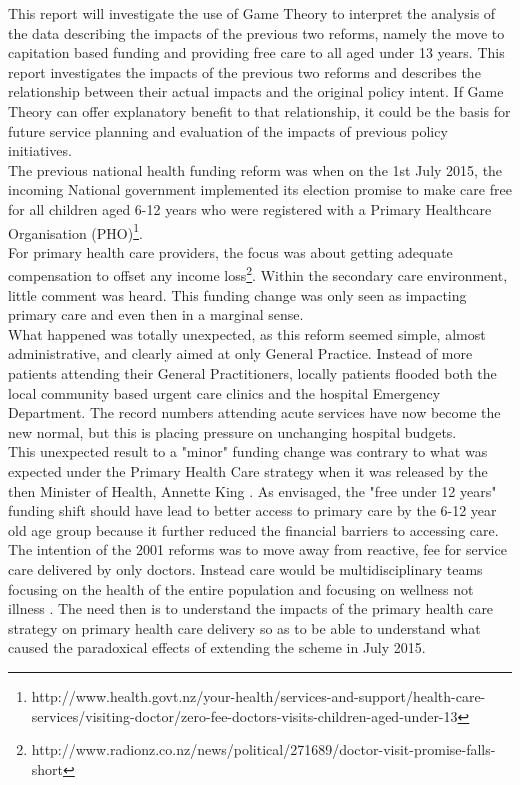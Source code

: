 \documentclass[11pt,a4paper]{article}
\begin{document}
This report will investigate the use of Game Theory to interpret the analysis of the data describing the impacts of the previous two reforms, namely the move to capitation based funding and providing free care to all aged under 13 years. This report investigates the impacts of the previous two reforms and describes the relationship between their actual impacts and the original policy intent. If Game Theory can offer explanatory benefit to that relationship, it could be the basis for future service planning and evaluation of the impacts of previous policy initiatives.\\ 

The previous national health funding reform was when on the 1st July 2015, the incoming National government implemented its election promise to make care free for all children aged 6-12 years who were registered with a Primary Healthcare Organisation (PHO)\footnote{http://www.health.govt.nz/your-health/services-and-support/health-care-services/visiting-doctor/zero-fee-doctors-visits-children-aged-under-13}.\\

For primary health care providers, the focus was about getting adequate compensation to offset any income loss\footnote{http://www.radionz.co.nz/news/political/271689/doctor-visit-promise-falls-short}. Within the secondary care environment, little comment was heard. This funding change was only seen as impacting primary care and even then in a marginal sense.\\

What happened was totally unexpected, as this reform seemed simple, almost administrative, and clearly aimed at only General Practice. Instead of more patients  attending their General Practitioners, locally patients flooded both the local community based urgent care clinics and the hospital Emergency Department. The record numbers attending acute services have now become the new normal, but this is placing pressure on unchanging hospital budgets. \\

This unexpected result to a "minor" funding change was contrary to what was expected under the Primary Health Care strategy when it was released by the then Minister of Health, Annette King \citep{king2001primary}. As envisaged, the "free under 12 years" funding shift should have lead to better access to primary care by the 6-12 year old age group because it further reduced the financial barriers to accessing care. The intention of the 2001 reforms was to move away from reactive, fee for service care delivered by only doctors. Instead care would be multidisciplinary teams focusing on the health of the entire population and focusing on wellness not illness \citep{king2001primary}.  The need then is to understand the impacts of the primary health care strategy on primary health care delivery so as to be able to understand what caused the paradoxical effects of extending the scheme in July 2015.\\
\end{document}
